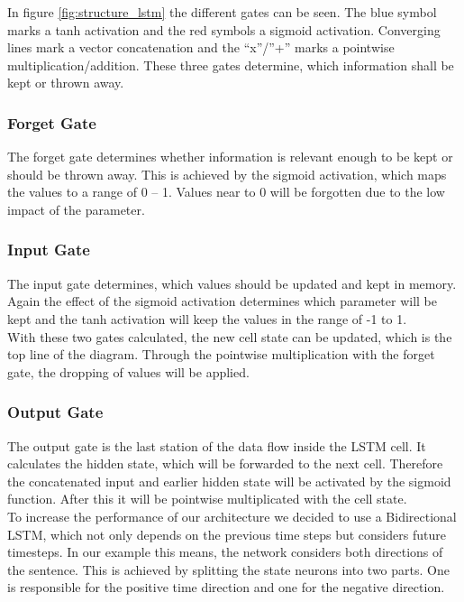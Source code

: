 \documentclass[conference]{IEEEtran}
\begin{document}
In figure \ref{fig:structure_lstm} the different gates can be seen. The blue symbol marks a tanh activation and the red symbols a sigmoid activation. Converging lines mark a vector concatenation and the “x”/”+” marks a pointwise multiplication/addition. These three gates determine, which information shall be kept or thrown away. 

\subsubsection{Forget Gate}

The forget gate determines whether information is relevant enough to be kept or should be thrown away. This is achieved by the sigmoid activation, which maps the values to a range of 0 – 1. Values near to 0 will be forgotten due to the low impact of the parameter.

\subsubsection{Input Gate}

The input gate determines, which values should be updated and kept in memory. Again the effect of the sigmoid activation determines which parameter will be kept and the tanh activation will keep the values in the range of -1 to 1.\\
With these two gates calculated, the new cell state can be updated, which is the top line of the diagram. Through the pointwise multiplication with the forget gate, the dropping of values will be applied.

\subsubsection{Output Gate}

The output gate is the last station of the data flow inside the LSTM cell. It calculates the hidden state, which will be forwarded to the next cell. Therefore the concatenated input and earlier hidden state will be activated by the sigmoid function. After this it will be pointwise multiplicated with the cell state.\\
To increase the performance of our architecture we decided to use a Bidirectional LSTM, which not only depends on the previous time steps but considers future timesteps. In our example this means, the network considers both directions of the sentence. This is achieved by splitting the state neurons into two parts. One is responsible for the positive time direction and one for the negative direction.
\end{document}
